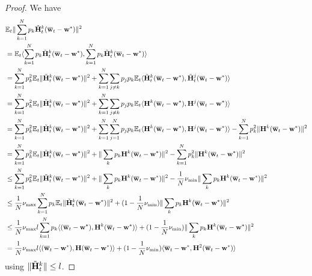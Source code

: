\begin{proof}
	We have 
	\begin{align*}
	& \mathbb{E}_{t}\|\sum_{k=1}^{N}p_{k}\tilde{{\mathbf{H}}}_{t}^{k}({\overline{\mathbf{w}}}_{t}-{\mathbf{w}}^{\ast})\|^{2}\\
	& =\mathbb{E}_{t}\langle\sum_{k=1}^{N}p_{k}\tilde{{\mathbf{H}}}_{t}^{k}({\overline{\mathbf{w}}}_{t}-{\mathbf{w}}^{\ast}),\sum_{k=1}^{N}p_{k}\tilde{{\mathbf{H}}}_{t}^{k}({\overline{\mathbf{w}}}_{t}-{\mathbf{w}}^{\ast})\rangle\\
	& =\sum_{k=1}^{N}p_{k}^{2}\mathbb{E}_{t}\|\tilde{{\mathbf{H}}}_{t}^{k}({\overline{\mathbf{w}}}_{t}-{\mathbf{w}}^{\ast})\|^{2}+\sum_{k=1}^{N}\sum_{j\neq k}p_{j}p_{k}\mathbb{E}_{t}\langle\tilde{{\mathbf{H}}}_{t}^{k}({\overline{\mathbf{w}}}_{t}-{\mathbf{w}}^{\ast}),\tilde{{\mathbf{H}}}_{t}^{j}({\overline{\mathbf{w}}}_{t}-{\mathbf{w}}^{\ast})\rangle\\
	& =\sum_{k=1}^{N}p_{k}^{2}\mathbb{E}_{t}\|\tilde{{\mathbf{H}}}_{t}^{k}({\overline{\mathbf{w}}}_{t}-{\mathbf{w}}^{\ast})\|^{2}+\sum_{k=1}^{N}\sum_{j\neq k}p_{j}p_{k}\mathbb{E}_{t}\langle {\mathbf{H}}^{k}({\overline{\mathbf{w}}}_{t}-{\mathbf{w}}^{\ast}),{\mathbf{H}}^{j}({\overline{\mathbf{w}}}_{t}-{\mathbf{w}}^{\ast})\rangle\\
	& =\sum_{k=1}^{N}p_{k}^{2}\mathbb{E}_{t}\|\tilde{{\mathbf{H}}}_{t}^{k}({\overline{\mathbf{w}}}_{t}-{\mathbf{w}}^{\ast})\|^{2}+\sum_{k=1}^{N}\sum_{j=1}^{N}p_{j}p_{k}\mathbb{E}_{t}\langle {\mathbf{H}}^{k}({\overline{\mathbf{w}}}_{t}-{\mathbf{w}}^{\ast}),{\mathbf{H}}^{j}({\overline{\mathbf{w}}}_{t}-{\mathbf{w}}^{\ast})\rangle-\sum_{k=1}^{N}p_{k}^{2}\|{\mathbf{H}}^{k}({\overline{\mathbf{w}}}_{t}-{\mathbf{w}}^{\ast})\|^{2}\\
	& =\sum_{k=1}^{N}p_{k}^{2}\mathbb{E}_{t}\|\tilde{{\mathbf{H}}}_{t}^{k}({\overline{\mathbf{w}}}_{t}-{\mathbf{w}}^{\ast})\|^{2}+\|\sum_{k}p_{k}{\mathbf{H}}^{k}({\overline{\mathbf{w}}}_{t}-{\mathbf{w}}^{\ast})\|^{2}-\sum_{k=1}^{N}p_{k}^{2}\|{\mathbf{H}}^{k}({\overline{\mathbf{w}}}_{t}-{\mathbf{w}}^{\ast})\|^{2}\\
	& \leq\sum_{k=1}^{N}p_{k}^{2}\mathbb{E}_{t}\|\tilde{{\mathbf{H}}}_{t}^{k}({\overline{\mathbf{w}}}_{t}-{\mathbf{w}}^{\ast})\|^{2}+\|\sum_{k}p_{k}{\mathbf{H}}^{k}({\overline{\mathbf{w}}}_{t}-{\mathbf{w}}^{\ast})\|^{2}-\frac{1}{N}\nu_{\min}\|\sum_{k}p_{k}{\mathbf{H}}^{k}({\overline{\mathbf{w}}}_{t}-{\mathbf{w}}^{\ast})\|^{2}\\
	& \leq\frac{1}{N}\nu_{\max}\sum_{k=1}^{N}p_{k}\mathbb{E}_{t}\|\tilde{{\mathbf{H}}}_{t}^{k}({\overline{\mathbf{w}}}_{t}-{\mathbf{w}}^{\ast})\|^{2}+(1-\frac{1}{N}\nu_{\min})\|\sum_{k}p_{k}{\mathbf{H}}^{k}({\overline{\mathbf{w}}}_{t}-{\mathbf{w}}^{\ast})\|^{2}\\
	& \leq\frac{1}{N}\nu_{\max}l\sum_{k=1}^{N}p_{k}\langle({\overline{\mathbf{w}}}_{t}-{\mathbf{w}}^{\ast}),{\mathbf{H}}^{k}({\overline{\mathbf{w}}}_{t}-{\mathbf{w}}^{\ast})\rangle+(1-\frac{1}{N}\nu_{\min})\|\sum_{k}p_{k}{\mathbf{H}}^{k}({\overline{\mathbf{w}}}_{t}-{\mathbf{w}}^{\ast})\|^{2}\\
	& =\frac{1}{N}\nu_{\max}l\langle({\overline{\mathbf{w}}}_{t}-{\mathbf{w}}^{\ast}),{\mathbf{H}}({\overline{\mathbf{w}}}_{t}-{\mathbf{w}}^{\ast})\rangle+(1-\frac{1}{N}\nu_{\min})\langle{\overline{\mathbf{w}}}_{t}-{\mathbf{w}}^{\ast},{\mathbf{H}}^{2}({\overline{\mathbf{w}}}_{t}-{\mathbf{w}}^{\ast})\rangle
	\end{align*}
	using $\|\tilde{{\mathbf{H}}}_{t}^{k}\|\leq l$. 
	

\end{proof}
